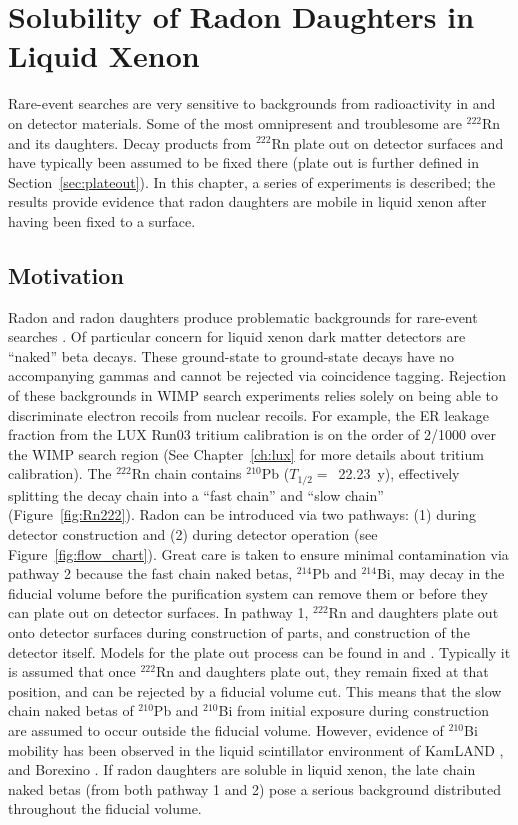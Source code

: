 \chapter{Solubility of Radon Daughters in Liquid Xenon}\label{ch:radon} %
Rare-event searches are very sensitive to backgrounds from radioactivity in and on detector materials. Some of the most omnipresent and troublesome are $^{222}$Rn and its daughters. Decay products from $^{222}$Rn plate out on detector surfaces and have typically been assumed to be fixed there (plate out is further defined in Section~\ref{sec:plateout}). In this chapter, a series of experiments is described; the results provide evidence that radon daughters are mobile in liquid xenon after having been fixed to a surface.

\section{Motivation}
Radon and radon daughters produce problematic backgrounds for rare-event searches \cite{LUXFirstResults}. Of particular concern for liquid xenon dark matter detectors are ``naked'' beta decays. These ground-state to ground-state decays have no accompanying gammas and cannot be rejected via coincidence tagging. Rejection of these backgrounds in WIMP search experiments relies solely on being able to discriminate electron recoils from nuclear recoils. For example, the \ac{ER} leakage fraction from the LUX Run03 tritium calibration is on the order of 2/1000 over the WIMP search region \cite{LUXTritium} (See Chapter~\ref{ch:lux} for more details about tritium calibration).  The $^{222}$Rn chain contains $^{210}$Pb ($T_{1/2} = $~22.23~y), effectively splitting the decay chain into a ``fast chain'' and ``slow chain'' (Figure~\ref{fig:Rn222}). Radon can be introduced via two pathways: (1) during detector construction and (2) during detector operation (see Figure~\ref{fig:flow_chart}). Great care is taken to ensure minimal contamination via pathway 2 because the fast chain naked betas, $^{214}$Pb and $^{214}$Bi, may decay in the fiducial volume before the purification system can remove them or before they can plate out on detector surfaces. In pathway 1, $^{222}$Rn and daughters plate out onto detector surfaces during construction of parts, and construction of the detector itself. Models for the plate out process can be found in \cite{Guiseppe:2011mj} and \cite{Knutson:1988}. Typically it is assumed that once $^{222}$Rn and daughters plate out, they remain fixed at that position, and can be rejected by a fiducial volume cut. This means that the slow chain naked betas of $^{210}$Pb and $^{210}$Bi from initial exposure during construction are assumed to occur outside the fiducial volume. However, evidence of $^{210}$Bi mobility has been observed in the liquid scintillator environment of KamLAND  \cite{Takemoto:2015gta}, \cite{Gando:2014wjd} and Borexino \cite{Bellini:2013lnn}. If radon daughters are soluble in liquid xenon, the late chain naked betas (from both pathway 1 and 2) pose a serious background distributed throughout the fiducial volume.


